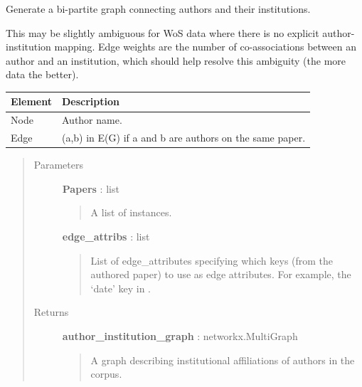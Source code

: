 \documentclass[letterpaper,10pt,english]{sphinxmanual}
\begin{document}
\begin{fulllineitems}
\label{tethne.networks.authors:tethne.networks.authors.author_institution}
Generate a bi-partite graph connecting authors and their institutions.

This may be slightly ambiguous for WoS data where there is no explicit
author-institution mapping. Edge weights are the number of co-associations
between an author and an institution, which should help resolve this
ambiguity (the more data the better).

\begin{tabulary}{\linewidth}{|L|L|}
\hline
\textsf{\relax 
Element
} & \textsf{\relax 
Description
}\\
\hline
Node
 & 
Author name.
\\

Edge
 & 
(a,b) in E(G) if a and b are authors on the same paper.
\\
\hline\end{tabulary}

\begin{quote}\begin{description}
\item[{Parameters}] \leavevmode
\textbf{Papers} : list
\begin{quote}

A list of {\hyperref[tethne.classes.paper:tethne.classes.paper.Paper]{}} instances.
\end{quote}

\textbf{edge\_attribs} : list
\begin{quote}

List of edge\_attributes specifying which {\hyperref[tethne.classes.paper:tethne.classes.paper.Paper]{}} keys (from the
authored paper) to use as edge attributes. For example, the `date' key
in {\hyperref[tethne.classes.paper:tethne.classes.paper.Paper]{}} .
\end{quote}

\item[{Returns}] \leavevmode
\textbf{author\_institution\_graph} : networkx.MultiGraph
\begin{quote}

A graph describing institutional affiliations of authors in the corpus.
\end{quote}

\end{description}\end{quote}

\end{fulllineitems}
\end{document}
